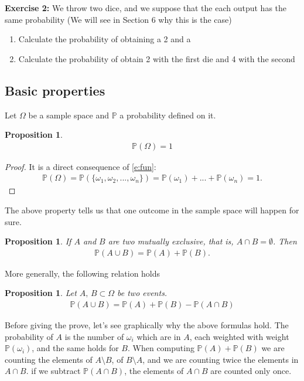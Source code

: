 \documentclass[12pt]{article}
\newtheorem{proposition}[theorem]{Proposition}
\newcommand{\<}{{\langle \!\! \langle}}
\renewcommand{\>}{{\rangle \!\! \rangle}}
\newcommand{\bel}[2]{\begin{equation} \label{#1} \begin{split} #2
 					\end{split} \end{equation}}
\begin{document}
\textbf{Exercise 2:}
We throw two dice, and we suppose that the each output has the same probability (We will see in Section 6 why this is the case)
\begin{enumerate} 
    
    \item Calculate the probability of obtaining a 2 and a
    
    \item Calculate the probability of obtain 2 with the first die and 4 with the second 
\end{enumerate}


\subsection{Basic properties}
Let $\Omega$ be a sample space and $\mathbb{P}$ a probability defined on it. 
\begin{proposition}
\label{p1}
\bel{e:normalization}{\mathbb{P}(\Omega)=1}
\end{proposition}

\begin{proof}

	It is a direct consequence of \eqref{e:fun}:
	\bel{}{\mathbb{P}(\Omega)=\mathbb{P}(\{\omega_1,\omega_2,...,\omega_n\})=\mathbb{P}(\omega_1)+...+\mathbb{P}(\omega_n)=1.}

\end{proof}

The above property tells us that one outcome in the sample space will happen for sure.
\begin{proposition}
If $A$ and $B$ are two \emph{mutually exclusive}, that is,  $A\cap B=\emptyset$. Then 
\bel{e:add}{
\mathbb{P}(A\cup B)=\mathbb{P}(A)+\mathbb{P}(B).}
\end{proposition}
More generally, the following relation holds
\begin{proposition}
Let $A,\, B\subset \Omega$ be two events. 
\bel{e:union}{\mathbb{P}(A\cup B)=\mathbb{P}(A)+\mathbb{P}(B)-\mathbb{P}(A\cap B)}
\end{proposition}
Before giving the  prove, let's see graphically why the above formulas hold. The probability of $A$ is the number of $\omega_i$ which are in $A$, each weighted with weight $\mathbb{P}(\omega_i)$,  and the same holds for $B$. When computing $\mathbb{P}(A) + \mathbb{P}(B)$ we are counting the elements of $A\setminus B$, of $B\setminus A$, and we are counting twice the elements in $ A \cap B$. if we subtract $\mathbb{P}(A\cap B)$, the elements of $A\cap B $ are counted only once.  
\end{document}

